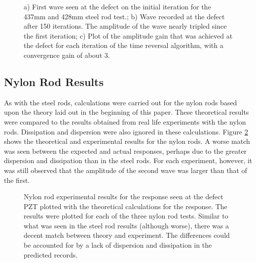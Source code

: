 \documentclass[11pt,letterpaper]{article}%
\begin{document}
 \begin{figure}
\begin{subfigmatrix}{3}
\end{subfigmatrix}

   \caption[all]
   { \label{steelExp3}
   a) First wave seen at the defect on the initial iteration for the 437mm and 428mm steel rod test.; b) Wave recorded at the defect after 150 iterations. The amplitude of the wave nearly tripled since the first iteration; c) Plot of the amplitude gain that was achieved at the defect for each iteration of the time reversal algorithm, with a convergence gain of about 3.
 }
\end{figure}

\subsection{Nylon Rod Results}
\label{sect:nylonRodResults}

As with the steel rods, calculations were carried out for the nylon rods based upon the theory laid out in the beginning of this paper. These theoretical results were compared to the results obtained from real life experiments with the nylon rods. Dissipation and dispersion were also ignored in these calculations. Figure \ref{nylonThExp} shows the theoretical and experimental results for the nylon rods. A worse match was seen between the expected and actual responses, perhaps due to the greater dispersion and dissipation than in the steel rods. For each experiment, however, it was still observed that the amplitude of the second wave was larger than that of the first.

 \begin{figure}
\begin{subfigmatrix}{3}
\end{subfigmatrix}

   \caption[all]
   { \label{nylonThExp}
Nylon rod experimental results for the response seen at the defect PZT plotted with the theoretical calculations for the response. The results were plotted for each of the three nylon rod tests. Similar to what was seen in the steel rod results (although worse),  there was a decent match between theory and experiment. The differences could be accounted for by a lack of dispersion and dissipation in the predicted records.
 }
 \end{figure}
\end{document}
